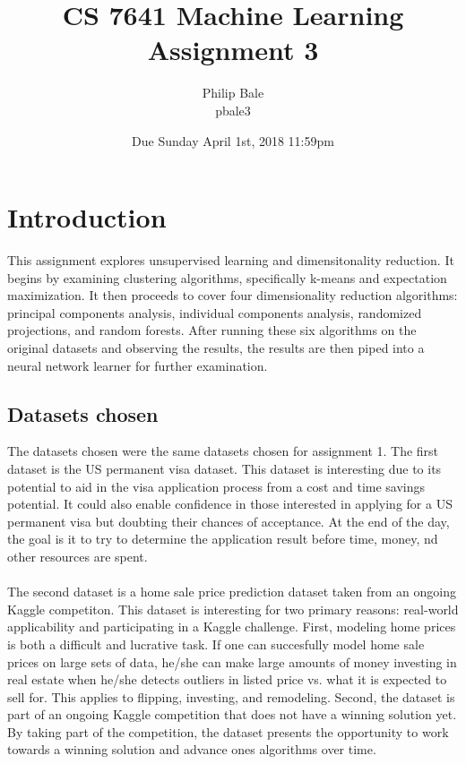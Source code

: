 \documentclass[h]{article}
\title{CS 7641 Machine Learning \\ Assignment 3}
\date{Due Sunday April 1st, 2018 11:59pm}
\author{Philip Bale \\ pbale3}
\begin{document}
\maketitle

\section*{Introduction}  
This assignment explores unsupervised learning and dimensitonality reduction.  
It begins by examining clustering algorithms, specifically k-means and 
expectation maximization.  It then proceeds to cover four dimensionality 
reduction algorithms: principal components analysis, individual components 
analysis, randomized projections, and random forests.  After running these six 
algorithms on the original datasets and observing the results, the results are 
then piped into a neural network learner for further examination.

\subsection*{Datasets chosen}  
The datasets chosen were the same datasets chosen for assignment 1.  The first dataset is the US 
permanent visa dataset.  This dataset is interesting due to its potential to aid in the visa application process 
from a cost and time savings potential. It could also enable confidence in those interested in applying for a 
US permanent visa but doubting their chances of acceptance. 
At the end of the day, the goal is it to try to determine the application result before time, money, 
nd other resources are spent. 
\\  \\
The second dataset is a home sale price prediction dataset taken from an ongoing 
Kaggle competiton.  This dataset is interesting for two primary reasons: real-world applicability and participating in a Kaggle challenge.
 First, modeling home prices is both a difficult and lucrative task. 
 If one can succesfully model home sale prices on large sets of data, he/she can make large amounts of money 
 investing in real estate when he/she detects outliers in listed price vs. what it is expected to sell for. 
 This applies to flipping, investing, and remodeling. 
 Second, the dataset is part of an ongoing Kaggle competition that does not have a winning solution yet.
  By taking part of the competition, the dataset presents the opportunity to work towards a winning solution 
  and advance ones algorithms over time.
\end{document}
